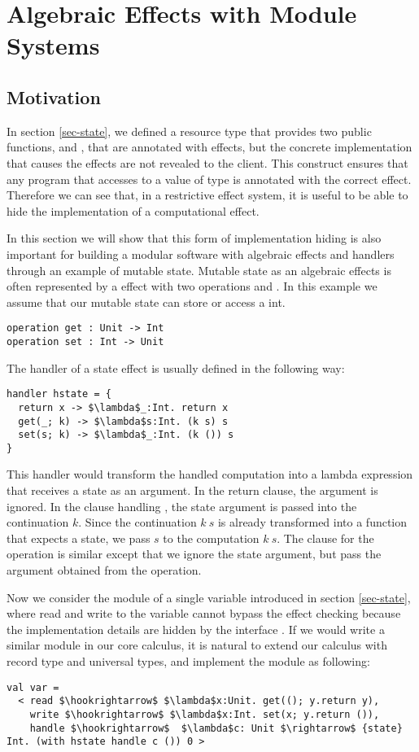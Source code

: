 
\chapter{Algebraic Effects with Module Systems}
\section{Motivation}
In section \ref{sec-state}, we defined a resource type  that provides two public functions,  and , that are annotated with effects, but the concrete implementation that causes the effects are not revealed to the client. This construct ensures that any program that accesses to a value of type  is annotated with the correct effect. Therefore we can see that, in a restrictive effect system, it is useful to be able to hide the implementation of a computational effect.  

In this section we will show that this form of implementation hiding is also important for building a modular software with algebraic effects and handlers through an example of mutable state. Mutable state as an algebraic effects is often represented by a  effect with two operations  and . In this example we assume that our mutable state can store or access a int.
\begin{lstlisting}
operation get : Unit -> Int
operation set : Int -> Unit
\end{lstlisting}

The handler of a state effect is usually defined in the following way:
\begin{lstlisting}[mathescape=true]
handler hstate = {
  return x -> $\lambda$_:Int. return x
  get(_; k) -> $\lambda$s:Int. (k s) s
  set(s; k) -> $\lambda$_:Int. (k ()) s
}
\end{lstlisting}
This handler would transform the handled computation into a lambda expression that receives a state as an argument. In the return clause, the argument is ignored. In the clause handling ,  the state argument is passed into the continuation $k$. Since the continuation $k\ s$ is already transformed into a function that expects a state, we pass $s$ to the computation $k\ s$. The clause for the  operation is similar except that we ignore the state argument, but pass the argument obtained from the  operation. 

Now we consider the module of a single variable introduced in section \ref{sec-state}, where read and write to the variable cannot bypass the effect checking because the implementation details are hidden by the interface . If we would write a similar module in our core calculus, it is natural to extend our calculus with record type and universal types, and implement the module as following:
\begin{lstlisting}[mathescape=true]
val var = 
  < read $\hookrightarrow$ $\lambda$x:Unit. get((); y.return y),
    write $\hookrightarrow$ $\lambda$x:Int. set(x; y.return ()),
    handle $\hookrightarrow$  $\lambda$c: Unit $\rightarrow$ {state} Int. (with hstate handle c ()) 0 >
\end{lstlisting}

